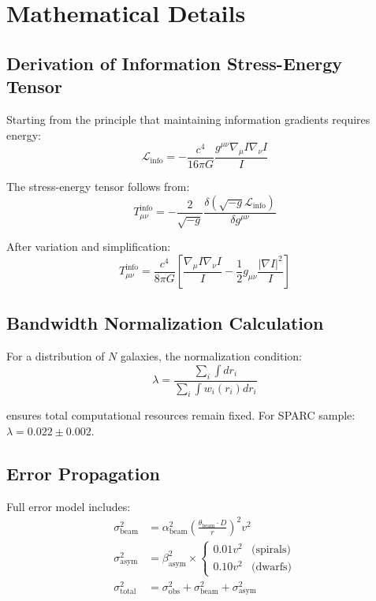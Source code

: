 \documentclass[12pt]{article}
\begin{document}
\appendix

\section{Mathematical Details}

\subsection{Derivation of Information Stress-Energy Tensor}

Starting from the principle that maintaining information gradients requires energy:
\begin{equation}
\mathcal{L}_{\text{info}} = -\frac{c^4}{16\pi G} \frac{g^{\mu\nu}\nabla_\mu I \nabla_\nu I}{I}
\end{equation}

The stress-energy tensor follows from:
\begin{equation}
T_{\mu\nu}^{\text{info}} = -\frac{2}{\sqrt{-g}} \frac{\delta(\sqrt{-g}\mathcal{L}_{\text{info}})}{\delta g^{\mu\nu}}
\end{equation}

After variation and simplification:
\begin{equation}
T_{\mu\nu}^{\text{info}} = \frac{c^4}{8\pi G}\left[\frac{\nabla_\mu I \nabla_\nu I}{I} - \frac{1}{2}g_{\mu\nu}\frac{|\nabla I|^2}{I}\right]
\end{equation}

\subsection{Bandwidth Normalization Calculation}

For a distribution of $N$ galaxies, the normalization condition:
\begin{equation}
\lambda = \frac{\sum_i \int dr_i}{\sum_i \int w_i(r_i) dr_i}
\end{equation}

ensures total computational resources remain fixed. For SPARC sample: $\lambda = 0.022 \pm 0.002$.

\subsection{Error Propagation}

Full error model includes:
\begin{align}
\sigma_{\text{beam}}^2 &= \alpha_{\text{beam}}^2 \left(\frac{\theta_{\text{beam}} \cdot D}{r}\right)^2 v^2\\
\sigma_{\text{asym}}^2 &= \beta_{\text{asym}}^2 \times \begin{cases}
0.01 v^2 & \text{(spirals)}\\
0.10 v^2 & \text{(dwarfs)}
\end{cases}\\
\sigma_{\text{total}}^2 &= \sigma_{\text{obs}}^2 + \sigma_{\text{beam}}^2 + \sigma_{\text{asym}}^2
\end{align}
\end{document}
